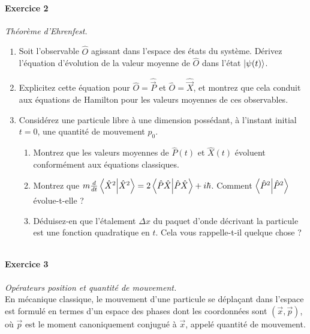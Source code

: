 \paragraph{Exercice 2} \textit{Théorème d'Ehrenfest.}
\begin{enumerate}
\item Soit l'observable $\hat O$ agissant dans l'espace des états du système. Dérivez l'équation d'évolution de la valeur moyenne de $\hat O$ dans l'état $\ket{\psi(t)}$.
\item Explicitez cette équation pour $\hat O = \hat{\vec{P}}$ et $\hat O = \hat{\vec{X}}$, et montrez que cela conduit aux équations de Hamilton pour les valeurs moyennes de ces observables. 
\item Considérez une particule libre à une dimension possédant, à l'instant initial $t=0$, une quantité de mouvement $p_0$.
\begin{enumerate}
\item Montrez que les valeurs moyennes de $\hat P(t)$ et $\hat X(t)$ évoluent conformément aux équations classiques.
\item Montrez que $m \frac{d}{dt}\braket{\hat X^2} = 2\braket{\hat P\hat X} + i\hbar$. Comment $\braket{\hat P^2}$ évolue-t-elle ?
\item Déduisez-en que l'étalement $\Delta x$ du paquet d'onde décrivant la particule est une fonction quadratique en $t$. Cela vous rappelle-t-il quelque chose ?
\end{enumerate}
\end{enumerate}
$ $



\paragraph{Exercice 3} \textit{Opérateurs position et quantité de mouvement.} \\
En mécanique classique, le mouvement d'une particule se déplaçant dans l'espace est formulé en termes d'un espace des phases dont les coordonnées sont $(\vec x,\vec p)$, où $\vec p$ est le moment canoniquement conjugué à $\vec x$, appelé quantité de mouvement. \\

